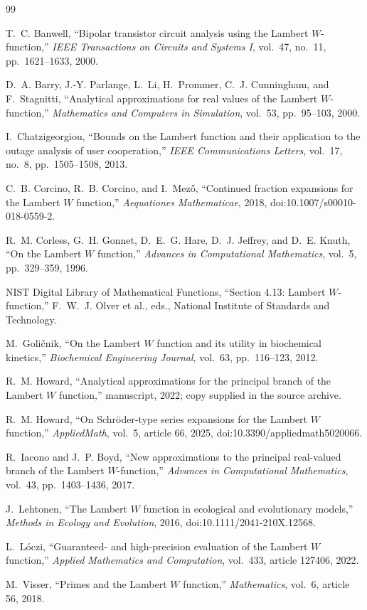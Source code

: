 \documentclass[11pt,openany]{book}
\theoremstyle{plain}
\theoremstyle{definition}
\theoremstyle{remark}
\begin{document}
\begin{thebibliography}{99}

T.~C. Banwell,
``Bipolar transistor circuit analysis using the Lambert \(W\)-function,''
\emph{IEEE Transactions on Circuits and Systems I}, vol.~47, no.~11,
pp.~1621--1633, 2000.

D.~A. Barry, J.-Y. Parlange, L.~Li, H.~Prommer, C.~J. Cunningham, and
F.~Stagnitti,
``Analytical approximations for real values of the Lambert \(W\)-function,''
\emph{Mathematics and Computers in Simulation}, vol.~53, pp.~95--103, 2000.

I.~Chatzigeorgiou,
``Bounds on the Lambert function and their application to the outage analysis
of user cooperation,''
\emph{IEEE Communications Letters}, vol.~17, no.~8, pp.~1505--1508, 2013.

C.~B. Corcino, R.~B. Corcino, and I.~Mez\H{o},
``Continued fraction expansions for the Lambert \(W\) function,''
\emph{Aequationes Mathematicae}, 2018,
doi:10.1007/s00010-018-0559-2.

R.~M. Corless, G.~H. Gonnet, D.~E.~G. Hare, D.~J. Jeffrey, and D.~E. Knuth,
``On the Lambert \(W\) function,''
\emph{Advances in Computational Mathematics}, vol.~5, pp.~329--359, 1996.

NIST Digital Library of Mathematical Functions,
``Section 4.13: Lambert \(W\)-function,''
F.~W.~J. Olver et al., eds., National Institute of Standards and Technology.

M.~Goli\v{c}nik,
``On the Lambert \(W\) function and its utility in biochemical kinetics,''
\emph{Biochemical Engineering Journal}, vol.~63, pp.~116--123, 2012.

R.~M. Howard,
``Analytical approximations for the principal branch of the Lambert \(W\)
function,'' manuscript, 2022; copy supplied in the source archive.

R.~M. Howard,
``On Schr\"oder-type series expansions for the Lambert \(W\) function,''
\emph{AppliedMath}, vol.~5, article 66, 2025,
doi:10.3390/appliedmath5020066.

R.~Iacono and J.~P. Boyd,
``New approximations to the principal real-valued branch of the Lambert
\(W\)-function,''
\emph{Advances in Computational Mathematics}, vol.~43, pp.~1403--1436, 2017.

J.~Lehtonen,
``The Lambert \(W\) function in ecological and evolutionary models,''
\emph{Methods in Ecology and Evolution}, 2016,
doi:10.1111/2041-210X.12568.

L.~L\'{o}czi,
``Guaranteed- and high-precision evaluation of the Lambert \(W\) function,''
\emph{Applied Mathematics and Computation}, vol.~433, article 127406, 2022.

M.~Visser,
``Primes and the Lambert \(W\) function,''
\emph{Mathematics}, vol.~6, article 56, 2018.

\end{thebibliography}
\end{document}
